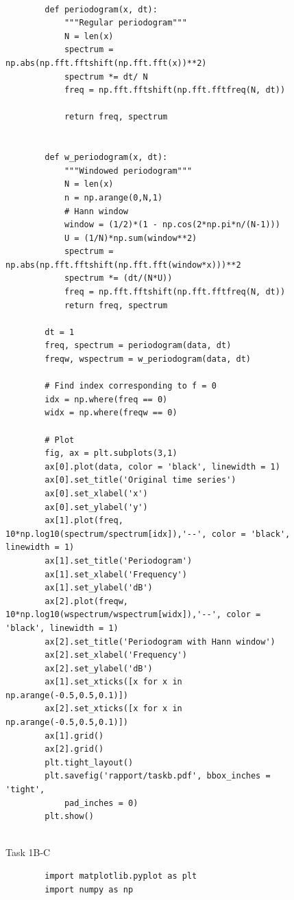 {\begin{figure}[H]
\begin{lstlisting}
        
        def periodogram(x, dt):
            """Regular periodogram"""
            N = len(x)
            spectrum = np.abs(np.fft.fftshift(np.fft.fft(x))**2)
            spectrum *= dt/ N
            freq = np.fft.fftshift(np.fft.fftfreq(N, dt))
        
            return freq, spectrum
        
        
        def w_periodogram(x, dt):
            """Windowed periodogram"""
            N = len(x)
            n = np.arange(0,N,1)
            # Hann window
            window = (1/2)*(1 - np.cos(2*np.pi*n/(N-1)))
            U = (1/N)*np.sum(window**2)
            spectrum = np.abs(np.fft.fftshift(np.fft.fft(window*x)))**2
            spectrum *= (dt/(N*U))
            freq = np.fft.fftshift(np.fft.fftfreq(N, dt))
            return freq, spectrum
        
        dt = 1
        freq, spectrum = periodogram(data, dt)
        freqw, wspectrum = w_periodogram(data, dt)
        
        # Find index corresponding to f = 0 
        idx = np.where(freq == 0)
        widx = np.where(freqw == 0)
        
        # Plot
        fig, ax = plt.subplots(3,1)
        ax[0].plot(data, color = 'black', linewidth = 1)
        ax[0].set_title('Original time series')
        ax[0].set_xlabel('x')
        ax[0].set_ylabel('y')
        ax[1].plot(freq, 10*np.log10(spectrum/spectrum[idx]),'--', color = 'black', linewidth = 1)
        ax[1].set_title('Periodogram')
        ax[1].set_xlabel('Frequency')
        ax[1].set_ylabel('dB')
        ax[2].plot(freqw, 10*np.log10(wspectrum/wspectrum[widx]),'--', color = 'black', linewidth = 1)
        ax[2].set_title('Periodogram with Hann window')
        ax[2].set_xlabel('Frequency')
        ax[2].set_ylabel('dB')
        ax[1].set_xticks([x for x in np.arange(-0.5,0.5,0.1)])
        ax[2].set_xticks([x for x in np.arange(-0.5,0.5,0.1)])
        ax[1].grid()
        ax[2].grid()
        plt.tight_layout()
        plt.savefig('rapport/taskb.pdf', bbox_inches = 'tight',
            pad_inches = 0)
        plt.show()
        
    \end{lstlisting}
\caption{Task 1B-C}
\label{Task1B-Ccode}
\end{figure}


\begin{figure}[H]
    \begin{lstlisting}
        import matplotlib.pyplot as plt 
        import numpy as np 
        

\end{lstlisting}
\end{figure}}
